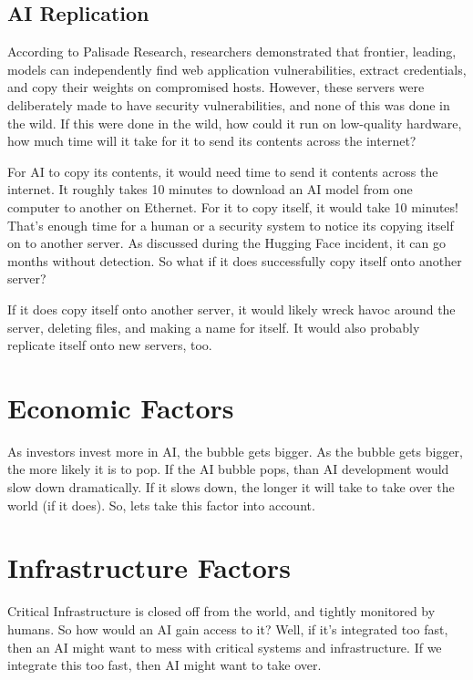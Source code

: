 \documentclass{report}
\begin{document}
	\subsection{AI Replication}
	According to Palisade Research, researchers demonstrated that frontier, leading, models can independently find web application vulnerabilities, extract credentials, and copy their weights on compromised hosts. However, these servers were deliberately made to have security vulnerabilities, and none of this was done in the wild. If this were done in the wild, how could it run on low-quality hardware, how much time will it take for it to send its contents across the internet? 
	
	\vspace{1cm}
	
	For AI to copy its contents, it would need time to send it contents across the internet. It roughly takes 10 minutes to download an AI model from one computer to another on Ethernet. For it to copy itself, it would take 10 minutes! That's enough time for a human or a security system to notice its copying itself on to another server. As discussed during the Hugging Face incident, it can go months without detection. So what if it does successfully copy itself onto another server?
	
	\vspace{1cm}
	
	If it does copy itself onto another server, it would likely wreck havoc around the server, deleting files, and making a name for itself. It would also probably replicate itself onto new servers, too.
	
	\section{Economic Factors}
	As investors invest more in AI, the bubble gets bigger. As the bubble gets bigger, the more likely it is to pop. If the AI bubble pops, than AI development would slow down dramatically. If it slows down, the longer it will take to take over the world (if it does). So, lets take this factor into account.
	
	\section{Infrastructure Factors}
	Critical Infrastructure is closed off from the world, and tightly monitored by humans. So how would an AI gain access to it? Well, if it's integrated too fast, then an AI might want to mess with critical systems and infrastructure. If we integrate this too fast, then AI might want to take over. 
	
\end{document}
